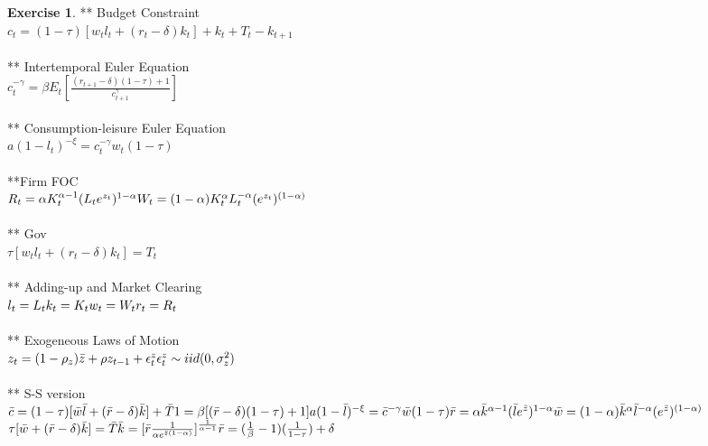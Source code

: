 \documentclass[letterpaper,12pt]{article}
\theoremstyle{definition}
\newtheorem{exercise}[theorem]{Exercise}
\begin{document}
\begin{spacing}{1.5}
	\begin{exercise} \label{DSGE_HW_CES}
** Budget Constraint \\
$c_t = (1-\tau)[w_tl_t + (r_t-\delta)k_t] + k_t + T_t - k_{t+1}$\\
\\** Intertemporal Euler Equation\\
$c_t^{-\gamma} = \beta E_t[\frac{(r_{t+1}-\delta)(1-\tau) +1}{c_{t+1}^{\gamma}}]$
\\
\\** Consumption-leisure Euler Equation\\
$a(1-l_t)^{-\xi} = c_t^{-\gamma}w_t(1-\tau)
$ \\
\\**Firm FOC\\
$R_t = \alpha K_t^{\alpha-1}(L_te^{z_t})^{1-\alpha}\\
W_t = (1-\alpha)K_t^{\alpha}L_t^{-\alpha} (e^{z_t})^{ (1-\alpha)}$
\\
\\** Gov\\
$\tau[w_tl_t + (r_t-\delta)k_t] = T_t$
\\
\\** Adding-up and Market Clearing\\
$l_t = L_t\\
k_t = K_t\\
w_t = W_t\\
r_t = R_t$
\\
\\** Exogeneous Laws of Motion\\
$z_t = (1-\rho_z)\bar{z} + \rho z_{t-1} +\epsilon_t^z\\
\epsilon_t^z \sim iid(0, \sigma_z^2) $
\\
\\
** S-S version\\
$\bar{c} = (1-\tau)[\bar{w}\bar{l} + (\bar{r}-\delta)\bar{k}] + \bar{T}\\
1 = \beta [(\bar{r}-\delta)(1-\tau) +1]\\
a(1-\bar{l})^{-\xi} = \bar{c}^{-\gamma}\bar{w}(1-\tau)\\
\bar{r} = \alpha \bar{k}^{\alpha-1}(\bar{l}e^{\bar{z}})^{1-\alpha} \\
\bar{w} = (1-\alpha)\bar{k}^{\alpha}\bar{l}^{-\alpha}(e^{\bar{z}})^{ (1-\alpha)}$\\
$\tau[\bar{w} + (\bar{r}-\delta)\bar{k}] = \bar{T}
\\
\\
\bar{k} = [\bar{r}\frac{1}{\alpha e^{\bar{z}(1-\alpha)}}]^{\frac{1}{\alpha -1}}\\
\bar{r} = (\frac{1}{\beta} - 1)(\frac{1}{1-\tau}) + \delta
$
	\end{exercise}


\end{spacing}
\end{document}

